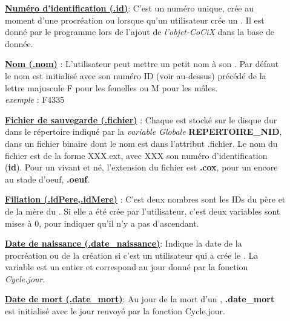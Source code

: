 \documentclass[french]{report}
\newlength{\du}\fi
\begin{document}
\begin{description}

\item[]\textbf{\underline{Numéro d'identification (.id)}}: C'est un numéro unique, crée au moment d'une procréation ou lorsque qu'un utilisateur crée un \CoCiX. Il est donné par le programme lors de l'ajout de \textit{l'objet-CoCiX} dans la base de donnée.\\

\item[]\textbf{\underline{Nom (.nom)}} : L'utilisateur peut mettre un petit nom à son \CoCiX. Par défaut le nom est initialisé avec son numéro ID (voir au-dessus) précédé de la lettre majuscule F pour les femelles ou M pour les mâles.\\
\textit{exemple }: 
F4335\\

\item[]\textbf{\underline{Fichier de sauvegarde (.fichier)}} : Chaque \CoCiX est stocké sur le disque dur dans le répertoire indiqué par la \textit{variable Globale} \textbf{REPERTOIRE\_NID}, dans un fichier binaire dont le nom est dans l'attribut .fichier. Le nom du fichier est de la forme XXX.ext, avec XXX son numéro d'identification (\textbf{id}). Pour un \CoCiX vivant et né, l'extension du fichier est \textbf{.cox}, pour un \CoCiX encore au stade d'oeuf, \textbf{.oeuf}.\\


\item[]\textbf{\underline{Filiation (.idPere,.idMere)}} : C'est deux nombres sont les IDs du père et de la mère du \CoCiX. Si elle a été crée par l'utilisateur, c'est deux variables sont mises à 0, pour indiquer qu'il n'y a pas d'ascendant.\\

\item[]\textbf{\underline{Date de naissance (.date\_naissance)}}: Indique la date de la procréation ou de la création si c'est un utilisateur qui a crée le \CoCiX. La variable est un entier et correspond au jour donné par la fonction \textit{Cycle.jour}.\\

\item[]\textbf{\underline{Date de mort (.date\_mort)}}: Au jour de la mort d'un \CoCiX, \textbf{.date\_mort} est initialisé avec le jour renvoyé par la fonction Cycle.jour.\\
 

\end{description}
\end{document}
